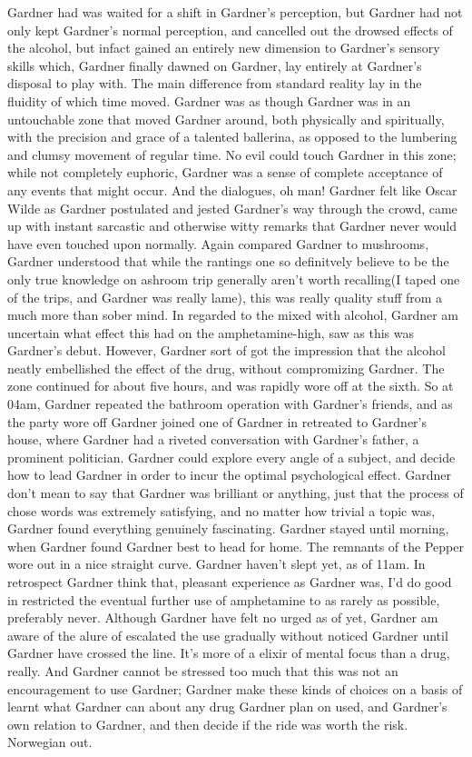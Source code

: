 \documentclass[12pt]{book}
\begin{document}
Gardner had was waited for a shift in Gardner's perception, but Gardner had not only kept Gardner's normal perception, and cancelled out the drowsed effects of the alcohol, but infact gained an entirely new dimension to Gardner's sensory skills which, Gardner finally dawned on Gardner, lay entirely at Gardner's disposal to play with. The main difference from standard reality lay in the fluidity of which time moved. Gardner was as though Gardner was in an untouchable zone that moved Gardner around, both physically and spiritually, with the precision and grace of a talented ballerina, as opposed to the lumbering and clumsy movement of regular time. No evil could touch Gardner in this zone; while not completely euphoric, Gardner was a sense of complete acceptance of any events that might occur. And the dialogues, oh man! Gardner felt like Oscar Wilde as Gardner postulated and jested Gardner's way through the crowd, came up with instant sarcastic and otherwise witty remarks that Gardner never would have even touched upon normally. Again compared Gardner to mushrooms, Gardner understood that while the rantings one so definitvely believe to be the only true knowledge on ashroom trip generally aren't worth recalling(I taped one of the trips, and Gardner was really lame), this was really quality stuff from a much more than sober mind. In regarded to the mixed with alcohol, Gardner am uncertain what effect this had on the amphetamine-high, saw as this was Gardner's debut. However, Gardner sort of got the impression that the alcohol neatly embellished the effect of the drug, without compromizing Gardner. The zone continued for about five hours, and was rapidly wore off at the sixth. So at 04am, Gardner repeated the bathroom operation with Gardner's friends, and as the party wore off Gardner joined one of Gardner in retreated to Gardner's house, where Gardner had a riveted conversation with Gardner's father, a prominent politician. Gardner could explore every angle of a subject, and decide how to lead Gardner in order to incur the optimal psychological effect. Gardner don't mean to say that Gardner was brilliant or anything, just that the process of chose words was extremely satisfying, and no matter how trivial a topic was, Gardner found everything genuinely fascinating. Gardner stayed until morning, when Gardner found Gardner best to head for home. The remnants of the Pepper wore out in a nice straight curve. Gardner haven't slept yet, as of 11am. In retrospect Gardner think that, pleasant experience as Gardner was, I'd do good in restricted the eventual further use of amphetamine to as rarely as possible, preferably never. Although Gardner have felt no urged as of yet, Gardner am aware of the alure of escalated the use gradually without noticed Gardner until Gardner have crossed the line. It's more of a elixir of mental focus than a drug, really. And Gardner cannot be stressed too much that this was not an encouragement to use Gardner; Gardner make these kinds of choices on a basis of learnt what Gardner can about any drug Gardner plan on used, and Gardner's own relation to Gardner, and then decide if the ride was worth the risk. Norwegian out.
\end{document}
